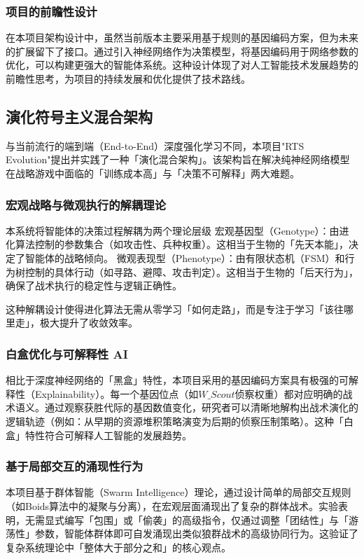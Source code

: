 \documentclass[12pt,a4paper]{article}
\begin{document}
	\subsubsection{项目的前瞻性设计}
	在本项目架构设计中，虽然当前版本主要采用基于规则的基因编码方案，但为未来的扩展留下了接口。通过引入神经网络作为决策模型，将基因编码用于网络参数的优化，可以构建更强大的智能体系统。这种设计体现了对人工智能技术发展趋势的前瞻性思考，为项目的持续发展和优化提供了技术路线。
	
	\subsection{演化符号主义混合架构}
	与当前流行的端到端（End-to-End）深度强化学习不同，本项目"RTS Evolution"提出并实践了一种「演化混合架构」。该架构旨在解决纯神经网络模型在战略游戏中面临的「训练成本高」与「决策不可解释」两大难题。
	
	\subsubsection{宏观战略与微观执行的解耦理论}
	本系统将智能体的决策过程解耦为两个理论层级
	宏观基因型（Genotype）：由进化算法控制的参数集合（如攻击性、兵种权重）。这相当于生物的「先天本能」，决定了智能体的战略倾向。
	微观表现型（Phenotype）：由有限状态机（FSM）和行为树控制的具体行动（如寻路、避障、攻击判定）。这相当于生物的「后天行为」，确保了战术执行的稳定性与逻辑正确性。
	
	这种解耦设计使得进化算法无需从零学习「如何走路」，而是专注于学习「该往哪里走」，极大提升了收敛效率。
	\subsubsection{白盒优化与可解释性 AI}
	相比于深度神经网络的「黑盒」特性，本项目采用的基因编码方案具有极强的可解释性（Explainability）。每一个基因位点（如$W\_Scout$侦察权重）都对应明确的战术语义。通过观察获胜代际的基因数值变化，研究者可以清晰地解构出战术演化的逻辑轨迹（例如：从早期的资源堆积策略演变为后期的侦察压制策略）。这种「白盒」特性符合可解释人工智能的发展趋势。
	\subsubsection{基于局部交互的涌现性行为}
	本项目基于群体智能（Swarm Intelligence）理论，通过设计简单的局部交互规则（如Boids算法中的凝聚与分离），在宏观层面涌现出了复杂的群体战术。实验表明，无需显式编写「包围」或「偷袭」的高级指令，仅通过调整「团结性」与「游荡性」参数，智能体群体即可自发涌现出类似狼群战术的高级协同行为。这验证了复杂系统理论中「整体大于部分之和」的核心观点。
	
\end{document}
